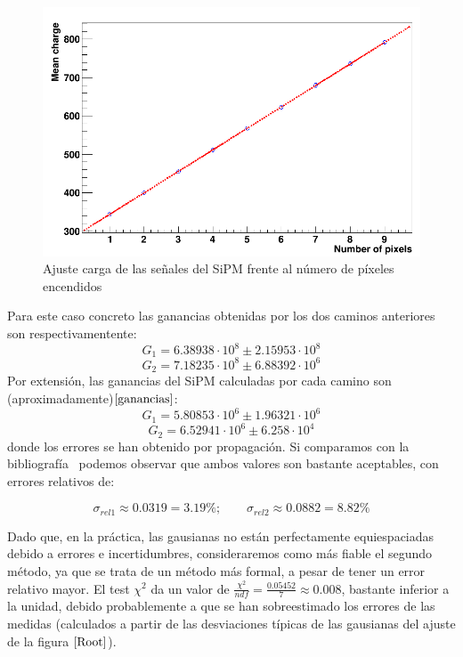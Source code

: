 \begin{enumerate}
\begin{enumerate}
	\begin{figure}[hbtp]
		\centering
		\includegraphics[scale=0.4]{FitPosicionPixels.png}
		\caption{Ajuste carga de las señales del SiPM frente al número de píxeles encendidos\label{ajuste}}
		\end{figure}
			
	\end{enumerate}
	
Para este caso concreto las ganancias obtenidas por los dos caminos anteriores son respectivamentente:
\begin{equation}
G_1= 6.38938 \cdot 10^8 \pm 2.15953 \cdot 10^8
\label{gananciatotalmetodo1} 
\end{equation}
\begin{equation}
G_2=7.18235 \cdot 10^8 \pm 6.88392 \cdot 10^6
\label{gananciatotalmetodo2}
\end{equation}
Por extensión, las ganancias del SiPM calculadas por cada camino son (aproximadamente)$\eqref{ganancias}$: 
\begin{equation}
G_1= 5.80853 \cdot 10^6 \pm 1.96321 \cdot 10^6
\label{gananciaSiPMmetodo1}
\end{equation}
\begin{equation}
G_2= 6.52941 \cdot 10^6 \pm 6.258 \cdot 10^4
\label{gananciaSiPMmetodo2}
\end{equation}
donde los errores se han obtenido por propagación. Si comparamos con la bibliografía~\cite{datasheet SiPM} podemos observar que ambos valores son bastante aceptables, con errores relativos de:

\begin{equation}
\sigma_{rel1} \approx 0.0319 = 3.19\%; \qquad \sigma_{rel2} \approx 0.0882 = 8.82\%
\label{erroresgananciasSiPM}
\end{equation}


Dado que, en la práctica, las gausianas no están perfectamente equiespaciadas debido a errores e incertidumbres, consideraremos como más fiable el segundo método, ya que se trata de un método más formal, a pesar de tener un error relativo mayor.
El test $\chi^2$ da un valor de  $\frac{\chi^2}{ndf}=\frac{0.05452}{7}\approx 0.008$, bastante inferior a la unidad, debido  probablemente a que se han sobreestimado los errores de las medidas (calculados a partir de las desviaciones típicas de las gausianas del ajuste de la figura $\ref{Root}$).

\end{enumerate}
